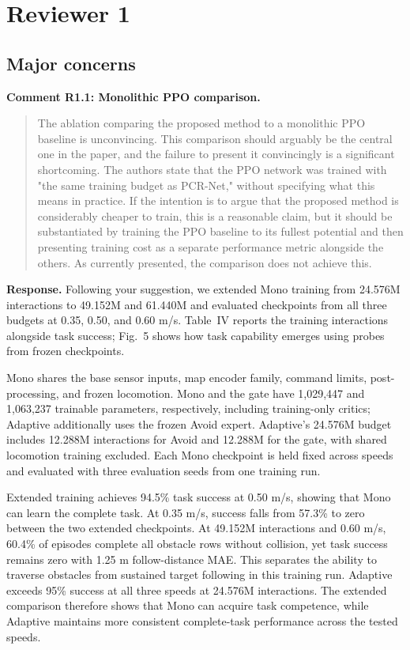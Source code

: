 \documentclass[letterpaper,11pt]{article}
\begin{document}
\section*{Reviewer 1}
\subsection*{Major concerns}
\noindent\textbf{Comment R1.1: Monolithic PPO comparison.}
\begin{quote}\color{reviewgray}
The ablation comparing the proposed method to a monolithic PPO baseline is unconvincing. This comparison should arguably be the central one in the paper, and the failure to present it convincingly is a significant shortcoming. The authors state that the PPO network was trained with "the same training budget as PCR-Net," without specifying what this means in practice. If the intention is to argue that the proposed method is considerably cheaper to train, this is a reasonable claim, but it should be substantiated by training the PPO baseline to its fullest potential and then presenting training cost as a separate performance metric alongside the others. As currently presented, the comparison does not achieve this.
\end{quote}
\noindent\textbf{Response.}
Following your suggestion, we extended Mono training from 24.576M interactions to 49.152M and 61.440M and evaluated checkpoints from all three budgets at 0.35, 0.50, and 0.60 m/s. Table~IV reports the training interactions alongside task success; Fig.~5 shows how task capability emerges using probes from frozen checkpoints.

Mono shares the base sensor inputs, map encoder family, command limits, post-processing, and frozen locomotion. Mono and the gate have 1,029,447 and 1,063,237 trainable parameters, respectively, including training-only critics; Adaptive additionally uses the frozen Avoid expert. Adaptive's 24.576M budget includes 12.288M interactions for Avoid and 12.288M for the gate, with shared locomotion training excluded. Each Mono checkpoint is held fixed across speeds and evaluated with three evaluation seeds from one training run.

Extended training achieves 94.5\% task success at 0.50 m/s, showing that Mono can learn the complete task. At 0.35 m/s, success falls from 57.3\% to zero between the two extended checkpoints. At 49.152M interactions and 0.60 m/s, 60.4\% of episodes complete all obstacle rows without collision, yet task success remains zero with 1.25 m follow-distance MAE. This separates the ability to traverse obstacles from sustained target following in this training run. Adaptive exceeds 95\% success at all three speeds at 24.576M interactions. The extended comparison therefore shows that Mono can acquire task competence, while Adaptive maintains more consistent complete-task performance across the tested speeds.
\par\nopagebreak[4]
\end{document}

